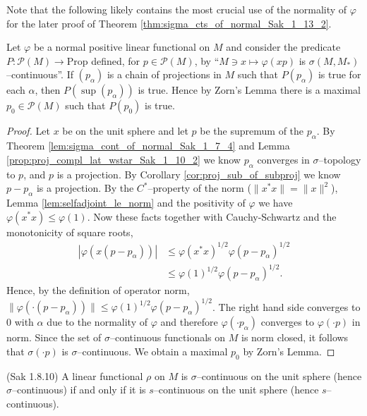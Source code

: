 Note that the following likely contains the most crucial use of the normality of $\varphi$ for the later proof
of Theorem \ref{thm:sigma_cts_of_normal_Sak_1_13_2}.

\begin{lemma}
  \label{lem:zorn_base}
  Let $\varphi$ be a normal positive linear functional on $M$ and consider the predicate $P:\mathcal{P}(M)\to \text{Prop}$ defined, for $p\in \mathcal{P}(M)$, by
  ``$M\ni x \mapsto \varphi(xp)$ is $\sigma(M,M_{*})$--continuous''. If $(p_{\alpha})$ is a chain of projections in $M$ such that $P(p_{\alpha})$ is true for each $\alpha$,
  then $P(\sup(p_{\alpha}))$ is true. Hence by Zorn's Lemma there is a maximal $p_0\in \mathcal{P}(M)$ such that $P(p_0)$ is true.
\end{lemma}

\begin{proof}
  Let $x$ be on the unit sphere and let $p$ be the supremum of the $p_{\alpha}$. By Theorem \ref{lem:sigma_cont_of_normal_Sak_1_7_4} and Lemma \ref{prop:proj_compl_lat_wstar_Sak_1_10_2}
  we know $p_{\alpha}$ converges in $\sigma$--topology to $p$, and $p$ is a projection.
  By Corollary \ref{cor:proj_sub_of_subproj} we know $p-p_\alpha$ is a projection. By the $C^{*}$--property
  of the norm ($\|x^{*}x\|=\|x\|^{2}$), Lemma \ref{lem:selfadjoint_le_norm} and the positivity of $\varphi$ we have $\varphi(x^{*}x)\le \varphi(1)$.
  Now these facts together with Cauchy-Schwartz and the monotonicity of square roots,
  \begin{align}
    |\varphi(x(p-p_{\alpha}))|&\le \varphi(x^{*}x)^{1/2}\varphi(p-p_{\alpha})^{1/2}\\ \nonumber
    &\le \varphi(1)^{1/2}\varphi(p-p_{\alpha})^{1/2}.
  \end{align}
  Hence, by the definition of operator norm, $\|\varphi(\cdot(p-p_{\alpha}))\|\le \varphi(1)^{1/2}\varphi(p-p_{\alpha})^{1/2}$. The right
  hand side converges to 0 with $\alpha$ due to the normality of $\varphi$ and therefore $\varphi(\cdot p_{\alpha})$ converges to $\varphi(\cdot p)$
  in norm. Since the set of $\sigma$--continuous functionals on $M$ is norm closed, it follows that $\sigma(\cdot p)$ is $\sigma$--continuous.
  We obtain a maximal $p_{0}$ by Zorn's Lemma.
\end{proof}

\begin{lemma}
  \label{lem:bdd_sigma_cts_iff_bdd_s_cts_Sak_1_8_10} (Sak 1.8.10)
  A linear functional $\rho$ on $M$ is $\sigma$--continuous on the unit sphere (hence $\sigma$--continuous) if and only if it is $s$--continuous on the
  unit sphere (hence $s$--continuous).
\end{lemma}

